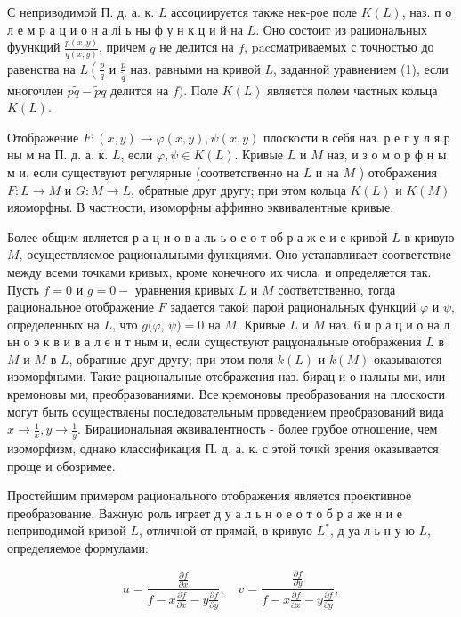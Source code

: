 \documentclass[10pt]{article}
\begin{document}
С неприводимой П. д. а. к. $L$ ассоциируется также нек-рое поле $K(L)$, наз. п о л е м р а ц и о н а лі ь ны ф у н к ц и й на $L$. Оно состоит из рациональных фуункций $\frac{p(x, y)}{q(x, y)}$, причем $q$ не делится на $f$, pacсматриваемых с точностью до равенства на $L\left(\frac{p}{q}\right.$ и $\frac{\tilde{p}}{\tilde{q}}$ наз. равными на кривой $L$, заданной уравнением (1), если многочлен $p \tilde{q}-\tilde{p} q$ делится на $f)$. Поле $K(L)$ является полем частных кольца $K(L)$.



Отображение $F:(x, y) \rightarrow \varphi(x, y), \psi(x, y)$ плоскости в себя наз. р е г у л я р ны м на П. д. а. к. $L$, если $\varphi, \psi \in K(L)$. Кривые $L$ и $M$ наз, и з о м о р ф н ы м и, если существуют регулярные (соответственно на $L$ и на $M$ ) отображения $F: L \rightarrow M$ и $G: M \rightarrow L$, обратные друг другу; при этом кольца $K(L)$ и $K(M)$ ияоморфны. В частности, изоморфны аффинно эквивалентные кривые.



Более общим является р а ц и о в а ль ь о е о т об р а ж е и е кривой $L$ в кривую $M$, осуществляемое рациональными функциями. Оно устанавливает соответствие между всеми точками кривых, кроме конечного их числа, и определяется так. Пусть $f=0$ и $g=0-$ уравнения кривых $L$ и $M$ соответственно, тогда рациональное отображение $F$ задается такой парой рациональных функций $\varphi$ и $\psi$, определенных на $L$, что $g(\varphi$, $\psi)=0$ на $M$. Кривые $L$ и $M$ наз. 6 и р а ц и о на л ьн о э к в и в а л е н т ным и, если существуют рацұональные отображения $L$ в $M$ и $M$ в $L$, обратные друг другу; при этом поля $k(L)$ и $k(M)$ оказываются изоморфными. Такие рациональные отображения наз. бирац и о нальны ми, или кремоновы ми, преобразованиями. Все кремоновы преобразования на плоскости могут быть осуществлены последовательным проведением преобразований вида $x \rightarrow \frac{1}{x}, y \rightarrow \frac{1}{y}$. Бирациональная әквивалентность - более грубое отношение, чем изоморфизм, однако классификация П. д. а. к. с этой точкй зрения оказывается проще и обозримее.



Простейшим примером рационального отображения является проективное преобразование. Важную роль играет д у а л ь н о е о т о б р а же н и е неприводимой кривой $L$, отличной от прямай, в кривую $L^{*}$, д уа л ь н у ю $L$, определяемое формулами:



\[

u=\frac{\frac{\partial f}{\partial x}}{f-x \frac{\partial f}{\partial x}-y \frac{\partial f}{\partial y}}, \quad v=\frac{\frac{\partial f}{\partial y}}{f-x \frac{\partial f}{\partial x}-y \frac{\partial f}{\partial y}},

\]
\end{document}
